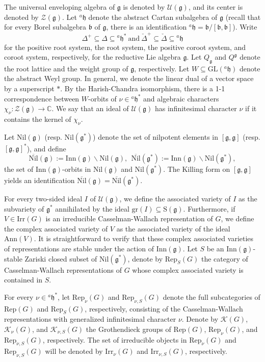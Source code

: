 \documentclass[12pt, a4paper]{amsart}
\numberwithin{equation}{section}
\newcommand{\BC}{{\mathbb {C}}}
\newcommand{\CK}{{\mathcal {K}}}
\newcommand{\CU}{{\mathcal {U}}}
\newcommand{\CZ}{{\mathcal {Z}}}
\newcommand{\RS}{{\mathrm {S}}}
\newcommand{\fb}{\mathfrak{b}}
\newcommand{\fg}{\mathfrak{g}}
\newcommand{\fh}{\mathfrak{h}}
\newcommand{\GL}{{\mathrm{GL}}}
\newcommand{\Irr}{{\mathrm{Irr}}}
\newcommand{\Inn}{{\mathrm{Inn}}}
\newcommand{\Ann}{{\mathrm{Ann}}}
\newcommand{\Rep}{{\mathrm{Rep}}}
\newcommand{\Nil}{{\mathrm{Nil}}}
\renewcommand{\bar}{\overline}
\begin{document}
The universal enveloping algebra of $\fg$ is denoted by $\CU(\fg)$, and its center is denoted by $\CZ(\fg)$. Let $^{a}\fh$ denote the abstract Cartan subalgebra of $\fg$ (recall that for every Borel subalgebra $\fb$ of $\fg$, there is an identification $^{a}\fh = \fb/[\fb,\fb]$). Write 
$$\Delta^+ \subseteq \Delta \subseteq {^{a}\fh^*} \ \textrm{and} \ \check{\Delta}^+ \subseteq \check{\Delta} \subseteq {^{a}\fh}$$
for the positive root system, the root system, the positive coroot system, and coroot system, respectively, for the reductive Lie algebra $\fg$. Let $Q_{\fg}$ and $Q^{\fg}$ denote the root lattice and the weight group of $\fg$, respectively. Let $W \subseteq \GL(^{a}\fh)$ denote the abstract Weyl group. In general, we denote the linear dual of a vector space by a superscript $*$. By the Harish-Chandra isomorphism, there is a 1-1 correspondence between $W$-orbits of $\nu \in {^{a}\fh^*}$ and algebraic characters $\chi_{\nu}:\CZ(\fg) \to \BC$. We say that an ideal of $\CU(\fg)$ has infinitesimal character $\nu$ if it contains the kernel of $\chi_{\nu}$.

Let $\Nil(\fg)$ (resp. $\Nil(\fg^*)$) denote the set of nilpotent elements in $[\fg,\fg]$ (resp. $[\fg,\fg]^*$), and define
\begin{equation}
   \bar{\Nil}(\fg) := \Inn(\fg) \backslash \Nil(\fg), \ \  \bar{\Nil}(\fg^*) := \Inn(\fg) \backslash \Nil(\fg^*),
\end{equation}
the set of $\Inn(\fg)$-orbits in $\Nil(\fg)$ and $\Nil(\fg^*)$. The Killing form on $[\fg,\fg]$ yields an identification $\bar{\Nil}(\fg) = \bar{\Nil}(\fg^*)$.

For every two-sided ideal $I$ of $\CU(\fg)$, we define the associated variety of $I$ as the subvariety of $\fg^*$ annihilated by the ideal $\mathrm{gr}(I) \subseteq \RS(\fg)$.  Furthermore, if $V \in \Irr(G)$ is an irreducible Casselman-Wallach representation of $G$, we define the complex associated variety of $V$ as the associated variety of the ideal $\Ann(V)$. It is straightforward to verify that these complex associated varieties of representations are stable under the action of $\Inn(\mathfrak{g})$. Let $S$ be an $\Inn(\fg)$-stable Zariski closed subset of $\Nil(\fg^*)$, denote by $\Rep_S(G)$ the category of Casselman-Wallach representations of $G$ whose complex associated variety is contained in $S$.

For every $\nu \in {^{a}\fh^*}$, let $\Rep_{\nu}(G)$ and $\Rep_{\nu,S}(G)$ denote the full subcategories of $\Rep(G)$ and $\Rep_S(G)$, respectively, consisting of the Casselman-Wallach representations with generalized infinitesimal character $\nu$. Denote by $\CK(G)$, $\CK_{\nu}(G)$, and $\CK_{\nu,S}(G)$ the Grothendieck groups of $\Rep(G)$, $\Rep_{\nu}(G)$, and $\Rep_{\nu,S}(G)$, respectively. The set of irreducible objects in $\Rep_{\nu}(G)$ and $\Rep_{\nu,S}(G)$ will be denoted by $\Irr_{\nu}(G)$ and $\Irr_{\nu,S}(G)$, respectively. 
\end{document}
